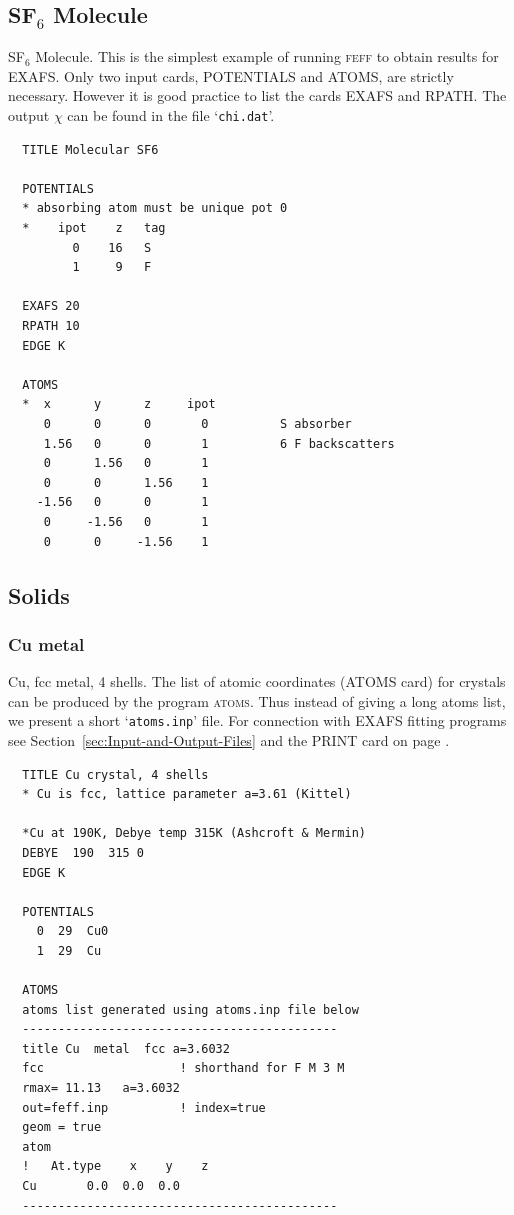 \documentclass[11pt,oneside]{report} %
\renewcommand{\htmlref}[2]{\hyperlink{#2}{#1}}
\newcommand{\program}[1]{\textsc{#1}}
\newcommand{\feff}{\program{feff}}
\newcommand{\file}[1]{`\texttt{#1}'}
\newcommand{\atoms}{\program{atoms}}
\renewcommand{\htmlref}[2]{{#1}} %
\begin{document}
\subsection{SF$_6$ Molecule}
\label{sec:Molecule}
SF$_6$ Molecule. This is the simplest example of running {\feff} to obtain
results for EXAFS. Only two input cards, POTENTIALS and ATOMS, are strictly necessary. However it is good practice to list the cards EXAFS and RPATH.  The output $\chi$ can be found in the file \file{chi.dat}.

\begin{verbatim}
  TITLE Molecular SF6
  
  POTENTIALS
  * absorbing atom must be unique pot 0
  *    ipot    z   tag
         0    16   S        
         1     9   F
  
  EXAFS 20
  RPATH 10
  EDGE K
  
  ATOMS
  *  x      y      z     ipot
     0      0      0       0          S absorber
     1.56   0      0       1          6 F backscatters
     0      1.56   0       1
     0      0      1.56    1
    -1.56   0      0       1
     0     -1.56   0       1
     0      0     -1.56    1
\end{verbatim}




\subsection{Solids}
\label{sec:Solid}

\subsubsection{Cu metal}
\label{sec:Cu-metal}

Cu, fcc metal, 4 shells. The list of atomic coordinates
(\htmlref{ATOMS}{card:ato} card) for crystals can be produced by the program
{\atoms}. Thus instead of giving a long atoms list, we present a short
\file{atoms.inp} file.  For connection with EXAFS fitting programs see
Section~\ref{sec:Input-and-Output-Files} and the \htmlref{PRINT}{card:pri}
card on page \pageref{card:pri}.

\begin{verbatim}
  TITLE Cu crystal, 4 shells
  * Cu is fcc, lattice parameter a=3.61 (Kittel)
  
  *Cu at 190K, Debye temp 315K (Ashcroft & Mermin)
  DEBYE  190  315 0
  EDGE K
  
  POTENTIALS
    0  29  Cu0
    1  29  Cu
  
  ATOMS
  atoms list generated using atoms.inp file below
  --------------------------------------------
  title Cu  metal  fcc a=3.6032
  fcc                   ! shorthand for F M 3 M
  rmax= 11.13   a=3.6032
  out=feff.inp          ! index=true
  geom = true
  atom
  !   At.type    x    y    z
  Cu       0.0  0.0  0.0
  --------------------------------------------
\end{verbatim}
\end{document}
